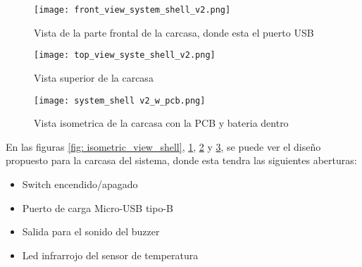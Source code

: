         \begin{figure}[htp!]
            \centering
                \texttt{[image: front\_view\_system\_shell\_v2.png]}
                \caption{Vista de la parte frontal de la carcasa, donde esta el puerto USB}
                \label{fig: front_view_shell}
        \end{figure}
        \FloatBarrier

        \begin{figure}[htp!]
            \centering
                \texttt{[image: top\_view\_syste\_shell\_v2.png]}
                \caption{Vista superior de la carcasa}
                \label{fig: top_view_shell}
        \end{figure}
        \FloatBarrier

        \begin{figure}[htp!]
            \centering
                \texttt{[image: system\_shell v2\_w\_pcb.png]}
                \caption{Vista isometrica de la carcasa con la PCB y bateria dentro}
                \label{isometric_view_pcb_shell}
        \end{figure}
        \FloatBarrier

        En las figuras \ref{fig: isometric_view_shell}, \ref{fig: front_view_shell},
        \ref{fig: top_view_shell} y \ref{isometric_view_pcb_shell}, se puede ver el diseño propuesto
        para la carcasa del sistema, donde esta tendra las siguientes aberturas:

        \begin{itemize}
            \item Switch encendido/apagado
            \item Puerto de carga Micro-USB tipo-B
            \item Salida para el sonido del buzzer
            \item Led infrarrojo del sensor de temperatura
        \end{itemize}

